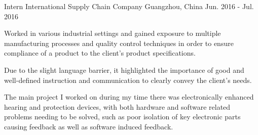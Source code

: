 \begin{cventries}
\cventry
{Intern} %
{International Supply Chain Company} %
{Guangzhou, China} %
{Jun. 2016 - Jul. 2016} %
{ %
\begin{cvitems}
\item {Worked in various industrial settings and gained exposure to multiple manufacturing processes and quality control techniques in order to ensure compliance of a product to the client's product specifications.}
\item {Due to the slight language barrier, it highlighted the importance of good and well-defined instruction and communication to clearly convey the client’s needs.}
\item {The main project I worked on during my time there was electronically enhanced hearing and protection devices, with both hardware and software related problems needing to be solved, such as poor isolation of key electronic parts causing feedback as well as software induced feedback.}
\end{cvitems}
}





\end{cventries}
